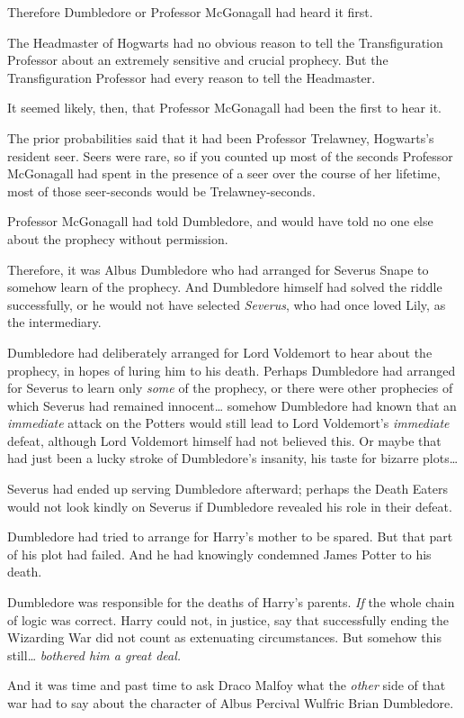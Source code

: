 Therefore Dumbledore or Professor McGonagall had heard it first.

The Headmaster of Hogwarts had no obvious reason to tell the Transfiguration 
Professor about an extremely sensitive and crucial prophecy. But the 
Transfiguration Professor had every reason to tell the Headmaster.

It seemed likely, then, that Professor McGonagall had been the first to hear it.

The prior probabilities said that it had been Professor Trelawney, Hogwarts's 
resident seer. Seers were rare, so if you counted up most of the seconds 
Professor McGonagall had spent in the presence of a seer over the course of her 
lifetime, most of those seer-seconds would be Trelawney-seconds.

Professor McGonagall had told Dumbledore, and would have told no one else about 
the prophecy without permission.

Therefore, it was Albus Dumbledore who had arranged for Severus Snape to 
somehow learn of the prophecy. And Dumbledore himself had solved the riddle 
successfully, or he would not have selected \emph{Severus}, who had once loved 
Lily, as the intermediary.

Dumbledore had deliberately arranged for Lord Voldemort to hear about the 
prophecy, in hopes of luring him to his death. Perhaps Dumbledore had arranged 
for Severus to learn only \emph{some} of the prophecy, or there were other 
prophecies of which Severus had remained innocent{\ldots} somehow Dumbledore 
had known that an \emph{immediate} attack on the Potters would still lead to 
Lord Voldemort's \emph{immediate} defeat, although Lord Voldemort himself had 
not believed this. Or maybe that had just been a lucky stroke of Dumbledore's 
insanity, his taste for bizarre plots{\ldots}

Severus had ended up serving Dumbledore afterward; perhaps the Death Eaters 
would not look kindly on Severus if Dumbledore revealed his role in their 
defeat.

Dumbledore had tried to arrange for Harry's mother to be spared. But that part 
of his plot had failed. And he had knowingly condemned James Potter to his 
death.

Dumbledore was responsible for the deaths of Harry's parents. \emph{If} the 
whole chain of logic was correct. Harry could not, in justice, say that 
successfully ending the Wizarding War did not count as extenuating 
circumstances. But somehow this still{\ldots} \emph{bothered him a great deal.}

And it was time and past time to ask Draco Malfoy what the \emph{other} side of 
that war had to say about the character of Albus Percival Wulfric Brian 
Dumbledore.
